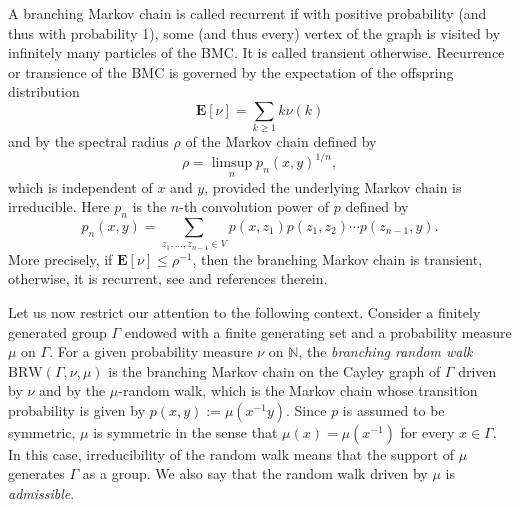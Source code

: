 \documentclass{amsart}
\newcommand{\showcomments}{yes}
\newenvironment{comment}%
{\ifthenelse{\equal{\showcomments}{yes}}%
{\footnotemark
    \begin{lrbox}{\commentbox}
    \begin{minipage}[t]{1.25in}\raggedright\sffamily\upshape\tiny
    \footnotemark[\arabic{footnote}]}%
{\begin{lrbox}{\commentbox}}}%
{\ifthenelse{\equal{\showcomments}{yes}}%
{\end{minipage}\end{lrbox}\marginpar{\usebox{\commentbox}}}%
{\end{lrbox}}}
\theoremstyle{definition}
\theoremstyle{remark}
\def\str{\sout}
\newcommand{\lw}[1]{{\color{cyan}{#1}}}
\begin{document}
A branching Markov chain is called recurrent if
with positive probability (and thus with probability 1), some (and thus every) vertex of the graph is visited by infinitely many particles of the BMC.
It is called transient otherwise.
Recurrence or transience of the BMC is governed by the expectation of the offspring distribution
$$\mathbf E[\nu]=\sum_{k\geq 1}k\nu(k)$$
and by the spectral radius $\rho$ of the Markov chain defined by
$$\rho=\limsup_np_n(x,y)^{1/n},$$
which is independent of $x$ and $y$, provided the underlying Markov chain is irreducible.
Here $p_n$ is the $n$-th convolution power of $p$ defined by
$$p_n(x,y)=\sum_{z_1,\ldots,z_{n-1}\in V}p(x,z_1)p(z_1,z_2)\cdots p(z_{n-1},y).$$
More precisely, if $\mathbf E[\nu]\leq \rho^{-1}$, then the branching Markov chain is transient, otherwise, it is recurrent, see \cite{BP94, GM06} and references therein.


Let us now restrict our attention to the following context.
Consider a finitely generated group $\Gamma$ endowed with a finite generating set and a probability measure $\mu$ on $\Gamma$.
For a given probability measure $\nu$ on $\mathbb N$, the \textit{branching random walk} $\mathrm{BRW}(\Gamma,\nu,\mu)$ is the branching Markov chain on the Cayley graph of $\Gamma$ driven by $\nu$ and by the $\mu$-random walk, which is the Markov chain whose transition probability is given by $p(x,y):=\mu(x^{-1}y)$.
Since $p$ is assumed to be symmetric, $\mu$ is symmetric in the sense that $\mu(x)=\mu(x^{-1})$ for every $x\in \Gamma$.
In this case, irreducibility of the random walk means that the support of $\mu$ generates $\Gamma$ as a group.
We also say that the random walk driven by $\mu$ is \textit{admissible}.
\end{document}
